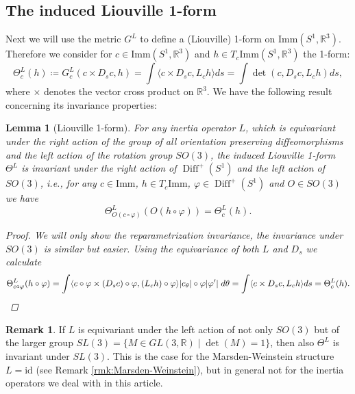 \documentclass[12pt]{amsart}
\newtheorem{lemma}[theorem]{Lemma}
\theoremstyle{definition}
\newtheorem{remark}[theorem]{Remark}
\newcommand{\R}{\mathbb R}
\newcommand{\Diffp}{\operatorname{Diff}^+(S^1)}
\newcommand{\id}{\mathrm{id}}
\newcommand{\Imm}{\mathrm{Imm}}
\def\Th{\Theta}
\def\R{{\mathbb R}}
\begin{document}
\subsection*{The induced Liouville 1-form}
Next we will use the metric $G^L$ to define a (Liouville) 1-form on $\Imm(S^1,\mathbb R^3)$. Therefore we consider for $c\in \Imm(S^1,\mathbb R^3)$ and $h\in T_c\Imm(S^1,\mathbb R^3)$ the 1-form: 
\begin{equation}\label{eq:Liouvilleform}
\Theta^L_c(h)\coloneqq G^L_c(c\times D_s  c, h)=\int \langle c\times D_sc, L_c h\rangle ds=\int \operatorname{det}(c, D_sc, L_c h) ds,
\end{equation}
where $\times$ denotes the vector cross product on $\mathbb R^3$. We have the following result concerning its invariance properties:
\begin{lemma}[Liouville 1-form]\label{lem:Liouville_one_form}
For any inertia operator $L$, which is equivariant under the right action of the group of all orientation preserving diffeomorphisms and the left action of the rotation group $SO(3)$, the induced Liouville 1-form $\Theta^L$ is invariant under the right action of $\Diffp$ and the left action of $SO(3)$, i.e., for any $c\in \Imm$, $h\in T_c\Imm$, $\varphi\in \Diffp$ and $O\in SO(3)$ we have 
\begin{equation}
\Theta^L_{O(c\circ\varphi)}(O(h\circ\varphi))=\Theta^L_c(h).
\end{equation}
\begin{proof}
We will only show the reparametrization invariance, the invariance under $SO(3)$ is similar but easier.
Using the equivariance of both $L$ and $D_s$ we calculate
\begin{equation*}
\Theta^L_{c\circ\varphi}(h\circ\varphi)=\int \langle c\circ\varphi \times (D_sc)\circ\varphi, (L_ch)\circ\varphi\rangle|c_\theta|\circ\varphi |\varphi'|\; d\theta=\int \langle c\times D_sc, L_c h\rangle ds=\Theta^L_c(h).\qedhere
\end{equation*}
\end{proof}
\end{lemma}

\begin{remark}
    If $L$ is equivariant under the left action of not only $SO(3)$ but of the larger group $SL(3)=\{M\in GL(3,\R)\mid \det(M)=1\}$, then also $\Th^L$ is invariant under $SL(3)$. This is the case for the Marsden-Weinstein structure $L=\id$ (see Remark \ref{rmk:Marsden-Weinstein}), but in general not for the inertia operators we deal with in this article.
\end{remark}
\end{document}
